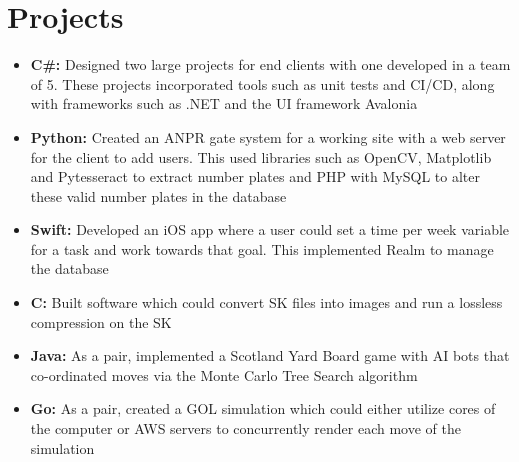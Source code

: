 \documentclass[a4paper,11pt]{article}
\newcommand{\resumeItemListStart}{\begin{justify}\begin{itemize}[leftmargin=3ex, rightmargin=2ex, noitemsep,labelsep=1.2mm,itemsep=0mm]\small}
\newcommand{\resumeItemListEnd}{\end{itemize}\end{justify}\vspace{-2mm}}
\begin{document}
\section{\textbf{Projects}}
\resumeItemListStart
  \item {\textbf{C\#:} Designed two large projects for end clients with one developed in a team of 5. 
            These projects incorporated tools such as unit tests and CI/CD, 
        along with frameworks such as .NET and the UI framework Avalonia}
    \item {\textbf{Python:} Created an ANPR gate system for a working site 
            with a web server for the client to add users. This used libraries such 
        as OpenCV, Matplotlib and Pytesseract to extract number plates and PHP with MySQL
    to alter these valid number plates in the database}
    \item {\textbf{Swift:} Developed an iOS app where a user could set a time per 
        week variable for a task and work towards that goal. This implemented Realm to manage 
    the database}
    \item {\textbf{C:} Built software which could convert SK files into images 
        and run a lossless compression on the SK}
    \item {\textbf{Java:} As a pair, implemented a Scotland Yard Board game 
        with AI bots that co-ordinated moves via the Monte Carlo Tree Search algorithm}
    \item {\textbf{Go:} As a pair, created a GOL simulation which could 
        either utilize cores of the computer or AWS servers to 
    concurrently render each move of the simulation}
\resumeItemListEnd

\end{document}
